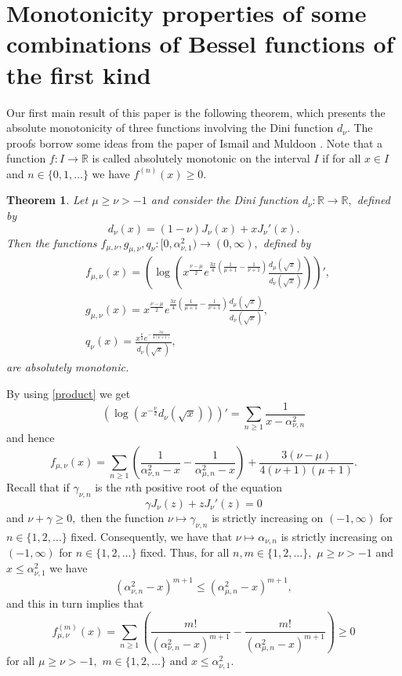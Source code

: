 \documentclass[journal]{IEEEtran}
\newtheorem{theorem}{Theorem}
\begin{document}
\section{Monotonicity properties of some combinations of Bessel functions of the first kind}

Our first main result of this paper is the following theorem, which presents the absolute monotonicity of three functions involving the Dini function $d_{\nu}$. The proofs borrow some ideas from the paper of Ismail and Muldoon \cite{isma}. Note that a function $f:I\to\mathbb{R}$ is called absolutely monotonic on the interval $I$ if for all $x\in I$ and $n\in\{0,1,\dots\}$ we have $f^{(n)}(x)\geq0.$

\begin{theorem}
{\em Let $\mu\geq \nu>-1$ and consider the Dini function $d_{\nu}:\mathbb{R}\to\mathbb{R},$ defined by $$d_{\nu}(x)=(1-\nu)J_{\nu}(x)+xJ_{\nu}'(x).$$ Then the functions $f_{\mu,\nu},g_{\mu,\nu},q_{\nu}:[0,\alpha_{\nu,1}^2)\to(0,\infty),$ defined by
\begin{align*}&f_{\mu,\nu}(x)=\left(\log\left(x^{\frac{\nu-\mu}{2}}e^{\frac{3x}{4}\left(\frac{1}{\mu+1}-\frac{1}{\nu+1}\right)}
\frac{d_{\mu}(\sqrt{x})}{d_{\nu}(\sqrt{x})}\right)\right)',\\
&g_{\mu,\nu}(x)=x^{\frac{\nu-\mu}{2}}e^{\frac{3x}{4}\left(\frac{1}{\mu+1}-\frac{1}{\nu+1}\right)}
\frac{d_{\mu}(\sqrt{x})}{d_{\nu}(\sqrt{x})},\\
&q_{\nu}(x)=\frac{x^{\frac{\nu}{2}}e^{-\frac{3x}{4(\nu+1)}}}{d_{\nu}(\sqrt{x})},\end{align*}
are absolutely monotonic.}
\end{theorem}

 By using \eqref{product} we get
$$\left(\log\left( x^{-\frac{\nu}{2}}d_{\nu}(\sqrt{x})\right)\right)'=\sum_{n\geq1}\frac{1}{x-\alpha_{\nu,n}^2}$$
and hence
$$f_{\mu,\nu}(x)=\sum_{n\geq1}\left(\frac{1}{\alpha_{\nu,n}^2-x}-\frac{1}{\alpha_{\mu,n}^2-x}\right)+\frac{3(\nu-\mu)}{4(\nu+1)(\mu+1)}.$$
Recall that \cite[p. 196]{landau} if $\gamma_{\nu,n}$ is the $n$th positive root of the equation $$\gamma{J}_\nu(z)+zJ_\nu'(z)=0$$ and $\nu+\gamma\geq0,$ then the function $\nu\mapsto \gamma_{\nu,n}$ is strictly increasing on $(-1,\infty)$ for $n\in\{1,2,\dots\}$ fixed. Consequently, we have that $\nu\mapsto \alpha_{\nu,n}$ is strictly increasing on $(-1,\infty)$ for $n\in\{1,2,\dots\}$ fixed. Thus, for all $n,m\in\{1,2,\dots\},$ $\mu\geq\nu>-1$ and $x\leq \alpha_{\nu,1}^2$ we have $$(\alpha_{\nu,n}^2-x)^{m+1}\leq(\alpha_{\mu,n}^2-x)^{m+1},$$ and this in turn implies that
$$f_{\mu,\nu}^{(m)}(x)=\sum_{n\geq 1}\left(\frac{m!}{(\alpha_{\nu,n}^2-x)^{m+1}}-\frac{m!}{(\alpha_{\mu,n}^2-x)^{m+1}}\right)\geq0$$
for all $\mu\geq\nu>-1,$ $m\in\{1,2,\dots\}$ and $x\leq \alpha_{\nu,1}^2.$
\end{document}
